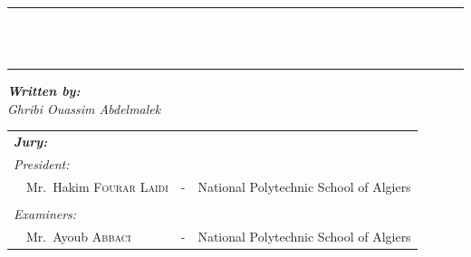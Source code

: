 {\begin{titlepage}
    \vspace{5mm}

    \center


    \vspace{2mm}


    \vspace{2mm}


    \vspace{5mm}

    \begin{bfseries}
        \rule{\linewidth}{1pt} \\
        \vspace{5mm}
         \\
        \vspace{5mm}
        \rule{\linewidth}{1pt}
    \end{bfseries}

    \begin{flushleft}
        \textit{\textbf{Written by:}}      \\
        \textit{Ghribi Ouassim Abdelmalek} \\
    \end{flushleft}

    \begin{center}
        \noindent \large
        \begin{tabular}{llcl}
            \textit{\textbf{Jury:}}                                &   &                                        & \\
            \textit{President:}                                    &   &                                        & \\
            \multicolumn{2}{l}{~~Mr.\ Hakim \textsc{Fourar Laidi}} & - & National Polytechnic School of Algiers   \\

            \\
            \textit{Examiners:}                                    &   &                                        & \\
            \multicolumn{2}{l}{~~Mr.\ Ayoub \textsc{Abbaci}}       & - & National Polytechnic School of Algiers   \\


\end{tabular}
\end{center}
\end{titlepage}}
